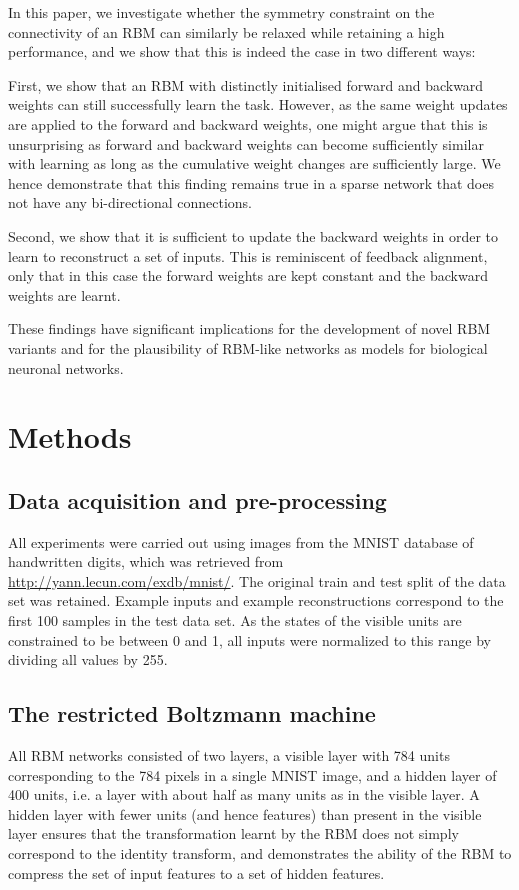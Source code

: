 \documentclass[11pt]{article}
\begin{document}
In this paper, we investigate whether the symmetry constraint on the
connectivity of an RBM can similarly be relaxed while retaining a high
performance, and we show that this is indeed the case in two different
ways:

First, we show that an RBM with distinctly initialised forward and
backward weights can still successfully learn the task. However, as
the same weight updates are applied to the forward and backward
weights, one might argue that this is unsurprising as forward and
backward weights can become sufficiently similar with learning as long
as the cumulative weight changes are sufficiently large. We hence
demonstrate that this finding remains true in a sparse network that
does not have any bi-directional connections.

Second, we show that it is sufficient to update the backward weights
in order to learn to reconstruct a set of inputs. This is reminiscent
of feedback alignment, only that in this case the forward weights are
kept constant and the backward weights are learnt.

These findings have significant implications for the development of
novel RBM variants and for the plausibility of RBM-like networks as
models for biological neuronal networks.


\section{Methods}

\subsection{Data acquisition and pre-processing}

All experiments were carried out using images from the MNIST database
of handwritten digits, which was retrieved from
\url{http://yann.lecun.com/exdb/mnist/}. The original train and test split
of the data set was retained. Example inputs and example
reconstructions correspond to the first 100 samples in the test data
set. As the states of the visible units are constrained to be between
0 and 1, all inputs were normalized to this range by dividing all
values by 255.

\subsection{The restricted Boltzmann machine}

All RBM networks consisted of two layers, a visible layer with 784
units corresponding to the 784 pixels in a single MNIST image, and a
hidden layer of 400 units, i.e. a layer with about half as many units
as in the visible layer. A hidden layer with fewer units (and hence
features) than present in the visible layer ensures that the
transformation learnt by the RBM does not simply correspond to the
identity transform, and demonstrates the ability of the RBM to
compress the set of input features to a set of hidden features.
\end{document}
